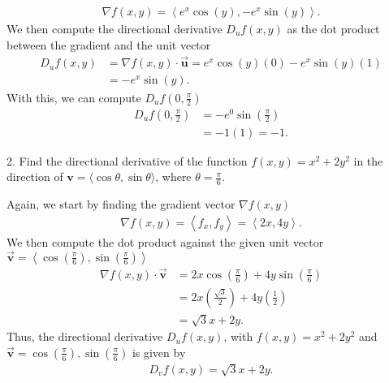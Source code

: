 \documentclass{report}
\begin{document}
    \begin{align*}
       \nabla f(x,y) = \left\langle e^{x}\cos{\left(y\right)}, -e^{x}\sin{\left(y\right)} \right\rangle 
    .\end{align*}
    We then compute the directional derivative $D_{u}f(x,y)$ as the dot product between the gradient and the unit vector
    \begin{align*}
        D_{u}f(x,y) &= \nabla f(x,y) \cdot \vec{\mathbf{u}} = e^{x}\cos{\left(y\right)}(0)  -e^{x}\sin{\left(y\right)}(1) \\
        &=-e^{x}\sin{\left(y\right)}
    .\end{align*}
    With this, we can compute $D_{u}f\left(0,\frac{\pi}{2}\right) $
    \begin{align*}
        D_{u}f\left(0,\frac{\pi}{2}\right) &= -e^{0}\sin{\left(\frac{\pi}{2}\right)} \\
        &=-1(1) = -1
    .\end{align*}

    \bigbreak \noindent 
    \begin{mdframed}
        2. Find the directional derivative of the function $f(x, y) = x^2 + 2y^2$ in the direction of $\mathbf{v} = \langle \cos \theta, \sin \theta \rangle$, where $\theta = \frac{\pi}{6}$.
    \end{mdframed}
    \bigbreak \noindent 
    Again, we start by finding the gradient vector $\nabla f(x,y)$
    \begin{align*}
        \nabla f(x,y) = \left\langle f_{x}, f_{y} \right\rangle = \left\langle 2x, 4y \right\rangle
    .\end{align*}
    \bigbreak \noindent 
    We then compute the dot product against the given unit vector $\vec{\mathbf{v}} = \left\langle \cos{\left(\frac{\pi}{6}\right)}, \sin{\left(\frac{\pi}{6}\right)} \right\rangle$
    \begin{align*}
        \nabla f(x,y) \cdot \vec{\mathbf{v}} &= 2x\cos{\left(\frac{\pi}{6}\right)} + 4y\sin{\left(\frac{\pi}{6}\right)} \\
        &=2x\left(\frac{\sqrt{3}}{2}\right) + 4y\left(\frac{1}{2}\right) \\
        &=\sqrt{3}x + 2y
    .\end{align*}
    \bigbreak \noindent 
    Thus, the directional derivative $D_{u}f(x,y)$, with $f(x,y) = x^{2} + 2y^{2}$ and $\vec{\mathbf{v}} = \cos{\left(\frac{\pi}{6}\right)}, \sin{\left(\frac{\pi}{6}\right)}$ is given by 
    \begin{align*}
        D_{v} f(x,y) = \sqrt{3}x + 2y
    .\end{align*}
\end{document}
